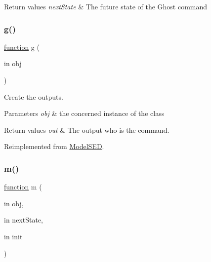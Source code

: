 \begin{DoxyRetVals}{Return values}
{\em next\+State} & The future state of the Ghost command \\
\hline
\end{DoxyRetVals}
\mbox{\label{class_model_ghost_a07dadfabe92bf9a144b8a862720e7746}} 
\subsubsection{\texorpdfstring{g()}{g()}}
{\footnotesize\ttfamily \hyperlink{_plan__desuma_functions__2_players_8m_ac2ffb26d6f42d3bbcd7847b0873403f4}{function} g (\begin{DoxyParamCaption}\item[{in}]{obj }\end{DoxyParamCaption})\hspace{0.3cm}{\ttfamily [virtual]}}



Create the outputs. 


\begin{DoxyParams}{Parameters}
{\em obj} & the concerned instance of the class \\
\hline
\end{DoxyParams}

\begin{DoxyRetVals}{Return values}
{\em out} & The output who is the command. \\
\hline
\end{DoxyRetVals}


Reimplemented from \hyperlink{class_model_s_e_d_ac6bf71081e35755d5ed9992d165afcb8}{Model\+S\+ED}.

\mbox{\label{class_model_ghost_a3140f24c6c4b80037b7d4f521c6ae2d3}} 
\subsubsection{\texorpdfstring{m()}{m()}}
{\footnotesize\ttfamily \hyperlink{_plan__desuma_functions__2_players_8m_ac2ffb26d6f42d3bbcd7847b0873403f4}{function} m (\begin{DoxyParamCaption}\item[{in}]{obj,  }\item[{in}]{next\+State,  }\item[{in}]{init }\end{DoxyParamCaption})\hspace{0.3cm}{\ttfamily [virtual]}}



